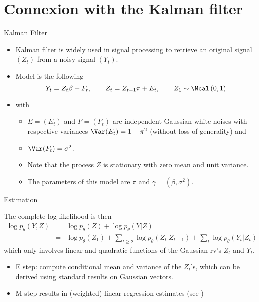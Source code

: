 \documentclass[compress,10pt]{beamer}
\begin{document}
\section{Connexion with the Kalman filter}
\begin{frame}{Kalman Filter}

\begin{itemize}
 \item Kalman filter is widely used in signal processing to retrieve an original signal $(Z_t)$ from a noisy signal $(Y_t)$.
 \item Model is the following
$$
Y_t = Z_t \beta + F_t, \qquad
Z_t = Z_{t-1} \pi + E_t, \qquad
Z_1 \sim \Ncal\left(0, 1\right)
$$
\item with
\begin{itemize}
\item  $E = (E_t)$ and $F = (F_t)$ are independent Gaussian white noises with respective variances $\Var(E_t) = 1 - \pi^2$ (without loss of generality) and 
\item $\Var(F_t) = \sigma^2$. 
\item Note that the process $Z$ is stationary with zero mean and unit variance. 
\item The parameters of this model are $\pi$ and $\gamma = (\beta, \sigma^2)$.
\end{itemize}
\end{itemize}
\end{frame}

\begin{frame}{Estimation}

The complete log-likelihood is then
\begin{eqnarray*}
\log p_\theta(Y, Z) & = & \log p_\theta(Z) + \log p_\theta(Y | Z) \\
  & = & \log p_\theta(Z_1) + \sum_{t \geq 2} \log p_\theta(Z_t | Z_{t-1}) + \sum_t \log p_\theta(Y_t | Z_t) %
\end{eqnarray*}
which only involves linear and quadratic functions of the Gaussian rv's $Z_t$ and $Y_t$. 

\begin{itemize}
 \item E step:  compute conditional mean and variance of the $Z_t$'s, which can be derived using standard results on Gaussian vectors.
 \item  M step results in (weighted) linear regression estimates (see \cite{GhH96})
\end{itemize}
\end{frame}
\end{document}
